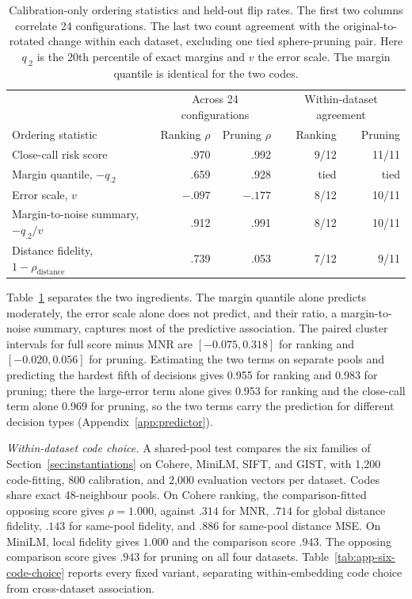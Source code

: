 \documentclass[twoside,11pt]{article}
\begin{document}
\begin{table}[tbp]
\centering
\small
\begin{tabular}{lrrrr}
\toprule
& \multicolumn{2}{c}{Across 24 configurations} & \multicolumn{2}{c}{Within-dataset agreement} \\
Ordering statistic & Ranking $\rho$ & Pruning $\rho$ & Ranking & Pruning \\
\midrule
Close-call risk score & .970 & .992 & 9/12 & 11/11 \\
Margin quantile, $-q_{.2}$ & .659 & .928 & tied & tied \\
Error scale, $v$ & $-.097$ & $-.177$ & 8/12 & 10/11 \\
Margin-to-noise summary, $-q_{.2}/v$ & .912 & .991 & 8/12 & 10/11 \\
Distance fidelity, $1-\rho_{\mathrm{distance}}$ & .739 & .053 & 7/12 & 9/11 \\
\bottomrule
\end{tabular}
\caption{Calibration-only ordering statistics and held-out flip rates. The first two columns correlate 24 configurations. The last two count agreement with the original-to-rotated change within each dataset, excluding one tied sphere-pruning pair. Here $q_{.2}$ is the 20th percentile of exact margins and $v$ the error scale. The margin quantile is identical for the two codes.}
\label{tab:predictor-controls}
\end{table}

Table~\ref{tab:predictor-controls} separates the two ingredients. The margin quantile alone predicts moderately, the error scale alone does not predict, and their ratio, a margin-to-noise summary, captures most of the predictive association. The paired cluster intervals for full score minus MNR are $[-0.075,0.318]$ for ranking and $[-0.020,0.056]$ for pruning. Estimating the two terms on separate pools and predicting the hardest fifth of decisions gives 0.955 for ranking and 0.983 for pruning; there the large-error term alone gives 0.953 for ranking and the close-call term alone 0.969 for pruning, so the two terms carry the prediction for different decision types (Appendix~\ref{app:predictor}).

\noindent\emph{Within-dataset code choice.}\quad
A shared-pool test compares the six families of Section~\ref{sec:instantiations} on Cohere, MiniLM, SIFT, and GIST, with 1{,}200 code-fitting, 800 calibration, and 2{,}000 evaluation vectors per dataset. Codes share exact 48-neighbour pools. On Cohere ranking, the comparison-fitted opposing score gives $\rho=1.000$, against $.314$ for MNR, $.714$ for global distance fidelity, $.143$ for same-pool fidelity, and $.886$ for same-pool distance MSE. On MiniLM, local fidelity gives $1.000$ and the comparison score $.943$. The opposing comparison score gives $.943$ for pruning on all four datasets. Table~\ref{tab:app-six-code-choice} reports every fixed variant, separating within-embedding code choice from cross-dataset association.
\end{document}
